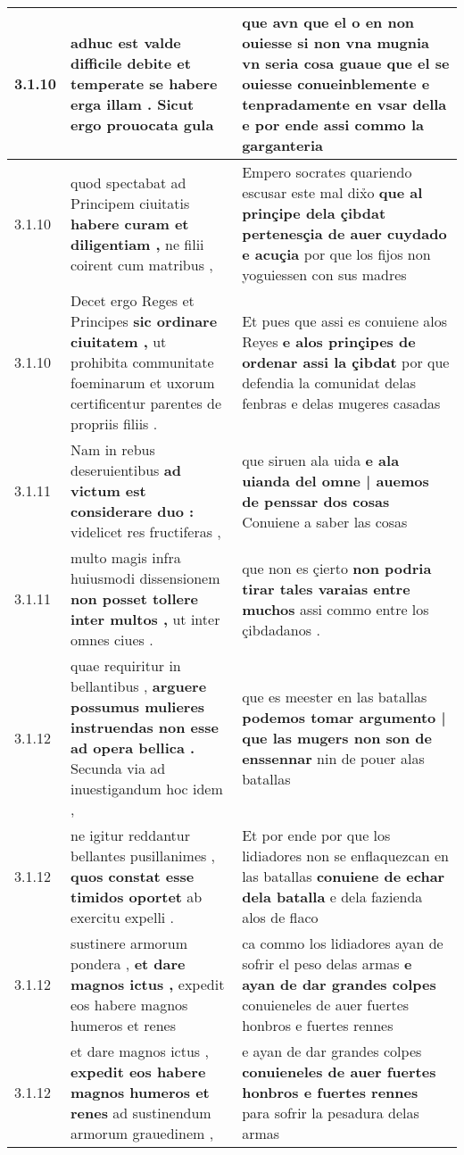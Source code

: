 \begin{tabular}{|p{1cm}|p{6.5cm}|p{6.5cm}|}
3.1.10 & adhuc est valde difficile debite \textbf{ et temperate se habere erga illam . } Sicut ergo prouocata gula & que avn que el o en non ouiesse si non vna mugnia vn seria cosa guaue que el se ouiesse conueinblemente \textbf{ e tenpradamente en vsar della } e por ende assi commo la garganteria \\\hline
3.1.10 & quod spectabat ad Principem ciuitatis \textbf{ habere curam et diligentiam , } ne filii coirent cum matribus , & Empero socrates quariendo escusar este mal dix̉o \textbf{ que al prinçipe dela çibdat pertenesçia de auer cuydado e acuçia } por que los fijos non yoguiessen con sus madres \\\hline
3.1.10 & Decet ergo Reges et Principes \textbf{ sic ordinare ciuitatem , } ut prohibita communitate foeminarum et uxorum certificentur parentes de propriis filiis . & Et pues que assi es conuiene alos Reyes \textbf{ e alos prinçipes de ordenar assi la çibdat } por que defendia la comunidat delas fenbras e delas mugeres casadas \\\hline
3.1.11 & Nam in rebus deseruientibus \textbf{ ad victum est considerare duo : } videlicet res fructiferas , & que siruen ala uida \textbf{ e ala uianda del omne | auemos de penssar dos cosas } Conuiene a saber las cosas \\\hline
3.1.11 & multo magis infra huiusmodi dissensionem \textbf{ non posset tollere inter multos , } ut inter omnes ciues . & que non es çierto \textbf{ non podria tirar tales varaias entre muchos } assi commo entre los çibdadanos . \\\hline
3.1.12 & quae requiritur in bellantibus , \textbf{ arguere possumus mulieres instruendas non esse ad opera bellica . } Secunda via ad inuestigandum hoc idem , & que es meester en las batallas \textbf{ podemos tomar argumento | que las mugers non son de enssennar } nin de pouer alas batallas \\\hline
3.1.12 & ne igitur reddantur bellantes pusillanimes , \textbf{ quos constat esse timidos oportet } ab exercitu expelli . & Et por ende por que los lidiadores non se enflaquezcan en las batallas \textbf{ conuiene de echar dela batalla } e dela fazienda alos de flaco \\\hline
3.1.12 & sustinere armorum pondera , \textbf{ et dare magnos ictus , } expedit eos habere magnos humeros et renes & ca commo los lidiadores ayan de sofrir el peso delas armas \textbf{ e ayan de dar grandes colpes } conuieneles de auer fuertes honbros e fuertes rennes \\\hline
3.1.12 & et dare magnos ictus , \textbf{ expedit eos habere magnos humeros et renes } ad sustinendum armorum grauedinem , & e ayan de dar grandes colpes \textbf{ conuieneles de auer fuertes honbros e fuertes rennes } para sofrir la pesadura delas armas \\\hline

\end{tabular}
